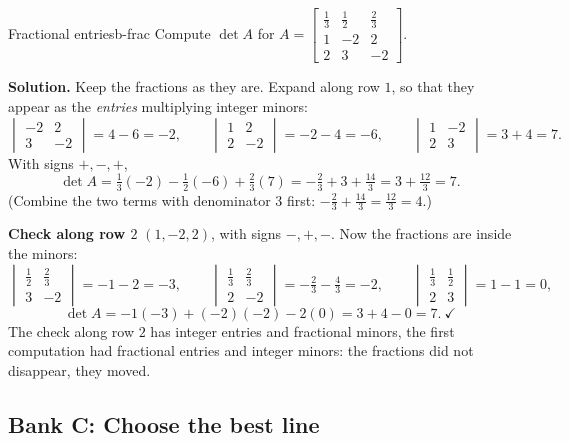 \documentclass[11pt]{article}
\begin{document}
\begin{exmp}{Fractional entries}{b-frac}
Compute $\det A$ for $A=\begin{bmatrix}\tfrac13&\tfrac12&\tfrac23\\1&-2&2\\2&3&-2\end{bmatrix}$.

\textbf{Solution.} Keep the fractions as they are. Expand along row $1$, so that they appear as the \emph{entries} multiplying integer minors:
\[
\begin{vmatrix}-2&2\\3&-2\end{vmatrix}=4-6=-2,\qquad
\begin{vmatrix}1&2\\2&-2\end{vmatrix}=-2-4=-6,\qquad
\begin{vmatrix}1&-2\\2&3\end{vmatrix}=3+4=7.
\]
With signs $+,-,+$,
\[
\det A=\tfrac13(-2)-\tfrac12(-6)+\tfrac23(7)=-\tfrac23+3+\tfrac{14}3=3+\tfrac{12}3=7.
\]
(Combine the two terms with denominator $3$ first: $-\tfrac23+\tfrac{14}3=\tfrac{12}3=4$.)

\textbf{Check along row $2$} $(1,-2,2)$, with signs $-,+,-$. Now the fractions are inside the minors:
\[
\begin{vmatrix}\tfrac12&\tfrac23\\3&-2\end{vmatrix}=-1-2=-3,\qquad
\begin{vmatrix}\tfrac13&\tfrac23\\2&-2\end{vmatrix}=-\tfrac23-\tfrac43=-2,\qquad
\begin{vmatrix}\tfrac13&\tfrac12\\2&3\end{vmatrix}=1-1=0,
\]
\[
\det A=-1(-3)+(-2)(-2)-2(0)=3+4-0=7.\ \checkmark
\]
The check along row $2$ has integer entries and fractional minors, the first computation had fractional entries and integer minors: the fractions did not disappear, they moved.
\end{exmp}

\subsection*{Bank C: Choose the best line}
\end{document}

